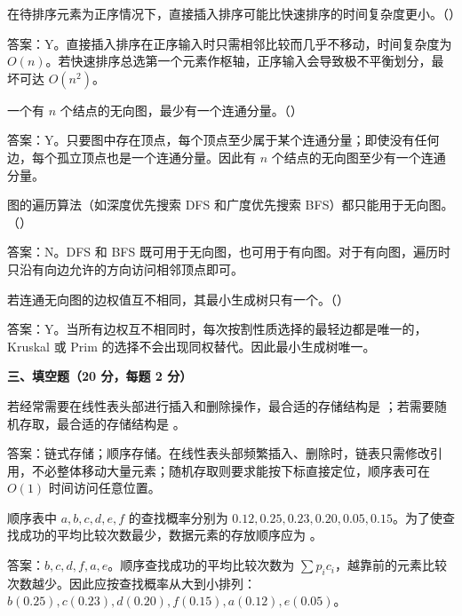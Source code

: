 \begin{question}
在待排序元素为正序情况下，直接插入排序可能比快速排序的时间复杂度更小。（\quad）
\begin{solution}
答案：Y。直接插入排序在正序输入时只需相邻比较而几乎不移动，时间复杂度为 $O(n)$。若快速排序总选第一个元素作枢轴，正序输入会导致极不平衡划分，最坏可达 $O(n^2)$。
\end{solution}
\end{question}

\begin{question}
一个有 $n$ 个结点的无向图，最少有一个连通分量。（\quad）
\begin{solution}
答案：Y。只要图中存在顶点，每个顶点至少属于某个连通分量；即使没有任何边，每个孤立顶点也是一个连通分量。因此有 $n$ 个结点的无向图至少有一个连通分量。
\end{solution}
\end{question}

\begin{question}
图的遍历算法（如深度优先搜索 DFS 和广度优先搜索 BFS）都只能用于无向图。（\quad）
\begin{solution}
答案：N。DFS 和 BFS 既可用于无向图，也可用于有向图。对于有向图，遍历时只沿有向边允许的方向访问相邻顶点即可。
\end{solution}
\end{question}

\begin{question}
若连通无向图的边权值互不相同，其最小生成树只有一个。（\quad）
\begin{solution}
答案：Y。当所有边权互不相同时，每次按割性质选择的最轻边都是唯一的，Kruskal 或 Prim 的选择不会出现同权替代。因此最小生成树唯一。
\end{solution}
\end{question}

\textbf{三、填空题（20 分，每题 2 分）}

\begin{question}
若经常需要在线性表头部进行插入和删除操作，最合适的存储结构是 \blank；若需要随机存取，最合适的存储结构是 \blank。
\begin{solution}
答案：链式存储；顺序存储。在线性表头部频繁插入、删除时，链表只需修改引用，不必整体移动大量元素；随机存取则要求能按下标直接定位，顺序表可在 $O(1)$ 时间访问任意位置。
\end{solution}
\end{question}

\begin{question}
顺序表中 $a,b,c,d,e,f$ 的查找概率分别为 $0.12,0.25,0.23,0.20,0.05,0.15$。为了使查找成功的平均比较次数最少，数据元素的存放顺序应为 \blank。
\begin{solution}
答案：$b,c,d,f,a,e$。顺序查找成功的平均比较次数为 $\sum p_i c_i$，越靠前的元素比较次数越少。因此应按查找概率从大到小排列：$b(0.25),c(0.23),d(0.20),f(0.15),a(0.12),e(0.05)$。
\end{solution}
\end{question}

